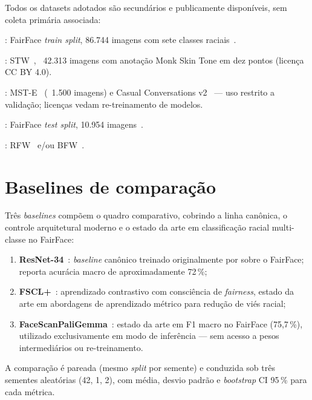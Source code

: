 Todos os datasets adotados são secundários e publicamente disponíveis, sem coleta primária associada:

\begin{description}[font=\bfseries\sffamily]
\item[Treino de classificação racial]: FairFace \emph{train split}, 86.744 imagens com sete classes raciais~\cite{karkkainen2021fairface}.
\item[Treino do extrator MST]: STW~\cite{matias2026large}, ~42.313 imagens com anotação Monk Skin Tone em dez pontos (licença CC BY 4.0).
\item[Validação de MST]: MST-E~\cite{schumann2023consensus} (~1.500 imagens) e Casual Conversations v2~\cite{porgali2023casual} --- uso restrito a validação; licenças vedam re-treinamento de modelos.
\item[Teste de classificação racial]: FairFace \emph{test split}, 10.954 imagens~\cite{karkkainen2021fairface}.
\item[Teste de transferência \emph{fair}]: RFW~\cite{wang2019racial} e/ou BFW~\cite{robinson2020face}.
\end{description}

\section{Baselines de comparação}
\label{sec:baselines}

Três \emph{baselines} compõem o quadro comparativo, cobrindo a linha canônica, o controle arquitetural moderno e o estado da arte em classificação racial multi-classe no FairFace:

\begin{enumerate}
\item \textbf{ResNet-34}~\cite{karkkainen2021fairface}: \emph{baseline} canônico treinado originalmente por  sobre o FairFace; reporta acurácia macro de aproximadamente 72\,\%;
\item \textbf{FSCL+}~\cite{park2022fair}: aprendizado contrastivo com consciência de \emph{fairness}, estado da arte em abordagens de aprendizado métrico para redução de viés racial;
\item \textbf{FaceScanPaliGemma}~\cite{aldahoul2024exploring}: estado da arte em F1 macro no FairFace (75,7\,\%), utilizado exclusivamente em modo de inferência --- sem acesso a pesos intermediários ou re-treinamento.
\end{enumerate}

A comparação é pareada (mesmo \emph{split} por semente) e conduzida sob três sementes aleatórias (42, 1, 2), com média, desvio padrão e \emph{bootstrap} CI 95\,\% para cada métrica.

